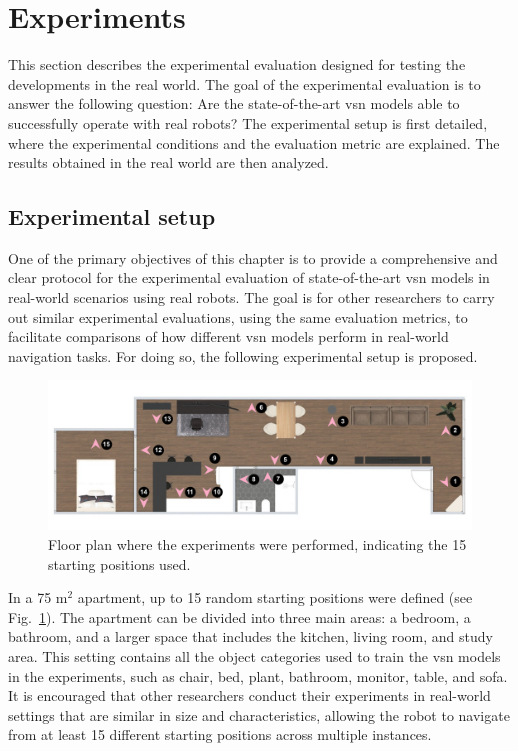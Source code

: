\section{Experiments}\label{sec:experiments}
This section describes the experimental evaluation designed for testing the developments in the real world.
The goal of the experimental evaluation is to answer the following question: Are the state-of-the-art \acrshort{vsn} models able to successfully operate with real robots?
The experimental setup is first detailed, where the experimental conditions and the evaluation metric are explained.
The results obtained in the real world are then analyzed.

\subsection{Experimental setup}
\label{subsec:experimental_setup}

One of the primary objectives of this chapter is to provide a comprehensive and clear protocol for the experimental evaluation of state-of-the-art \acrshort{vsn} models in real-world scenarios using real robots.
The goal is for other researchers to carry out similar experimental evaluations, using the same evaluation metrics, to facilitate comparisons of how different \acrshort{vsn} models perform in real-world navigation tasks.
For doing so, the following experimental setup is proposed.

\begin{figure}[t]
    \centering
        \includegraphics[width=\linewidth]{figures/ros4vsn/plano_vivienda}
        \caption{Floor plan where the experiments were performed, indicating the 15 starting positions used.}
        \label{fig:floor_plan}
\end{figure}

In a 75 m$^2$ apartment, up to 15 random starting positions were defined (see Fig.~\ref{fig:floor_plan}).
The apartment can be divided into three main areas: a bedroom, a bathroom, and a larger space that includes the kitchen, living room, and study area.
This setting contains all the object categories used to train the \acrshort{vsn} models in the experiments, such as chair, bed, plant, bathroom, monitor, table, and sofa.
It is encouraged that other researchers conduct their experiments in real-world settings that are similar in size and characteristics, allowing the robot to navigate from at least 15 different starting positions across multiple instances.

